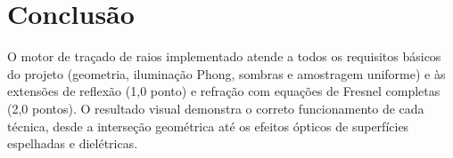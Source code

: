 \documentclass[12pt,a4paper]{article}
\begin{document}
\section{Conclusão}

O motor de traçado de raios implementado atende a todos os requisitos
básicos do projeto (geometria, iluminação Phong, sombras e amostragem
uniforme) e às extensões de reflexão (1{,}0 ponto) e refração com
equações de Fresnel completas (2{,}0 pontos). O resultado visual
demonstra o correto funcionamento de cada técnica, desde a interseção
geométrica até os efeitos ópticos de superfícies espelhadas e
dielétricas.
\end{document}
